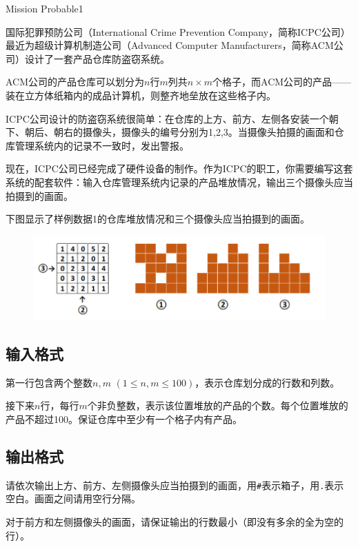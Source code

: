 \begin{Problem}{Mission Probable}{1}

国际犯罪预防公司（International Crime Prevention Company，简称ICPC公司）最近为超级计算机制造公司（Advanced Computer Manufacturers，简称ACM公司）设计了一套产品仓库防盗窃系统。

ACM公司的产品仓库可以划分为$n$行$m$列共$n \times m$个格子，而ACM公司的产品——装在立方体纸箱内的成品计算机，则整齐地垒放在这些格子内。

ICPC公司设计的防盗窃系统很简单：在仓库的上方、前方、左侧各安装一个朝下、朝后、朝右的摄像头，摄像头的编号分别为1,2,3。当摄像头拍摄的画面和仓库管理系统内的记录不一致时，发出警报。

现在，ICPC公司已经完成了硬件设备的制作。作为ICPC的职工，你需要编写这套系统的配套软件：输入仓库管理系统内记录的产品堆放情况，输出三个摄像头应当拍摄到的画面。

下图显示了样例数据1的仓库堆放情况和三个摄像头应当拍摄到的画面。

\begin{figure}[h]
\center
\includegraphics{src/view/view.png}
\end{figure}


\subsection*{输入格式}

第一行包含两个整数$n, m$ $(1 \leq n, m \leq 100)$，表示仓库划分成的行数和列数。

接下来$n$行，每行$m$个非负整数，表示该位置堆放的产品的个数。每个位置堆放的产品不超过100。保证仓库中至少有一个格子内有产品。

\subsection*{输出格式}

请依次输出上方、前方、左侧摄像头应当拍摄到的画面，用\verb|#|表示箱子，用\texttt{.}表示空白。画面之间请用空行分隔。

对于前方和左侧摄像头的画面，请保证输出的行数最小（即没有多余的全为空的行）。

\ifodd\value{page}
    \newpage
\fi


\end{Problem}
